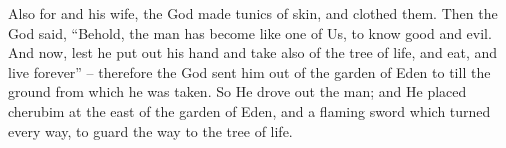 \bverse Also for \Adam and his wife, the \lord God made tunics of skin, and clothed them.
\bverse Then the \lord God said, ``Behold, the man has become like one of Us, to know good and evil. And now, lest he put out his hand and take also of the tree of life, and eat, and live forever'' --
\bverse therefore the \lord God sent him out of the garden of Eden to till the ground from which he was taken.
\bverse So He drove out the man; and He placed cherubim at the east of the garden of Eden, and a flaming sword which turned every way, to guard the way to the tree of life.




